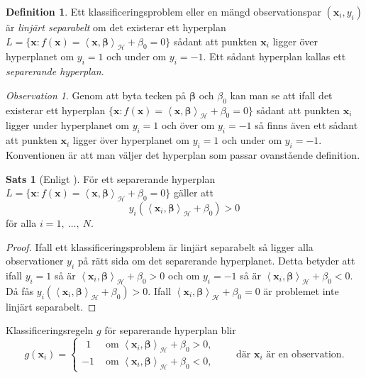 \documentclass[a4paper, 12pt]{report}
\theoremstyle{definition}
\newtheorem{thm}{Sats}[section]
\newtheorem{defi}{Definition}[section]
\theoremstyle{remark}
\newtheorem*{rem}{Observation}
\newcommand{\bfbeta}{{\boldsymbol{\beta}}}
\newcommand{\bfx}{\mathbf{x}}
\newcommand{\llangle}{\left\langle}
\newcommand{\rrangle}{\right\rangle}
\newcommand{\sephyp}{\{ \mathbf{x} : f\left(\mathbf{x}\right)=\inner{\bfx}{\bfbeta}_\mathcal{H} + \beta_0=0\}}
\newcommand{\inner}[2]{\llangle #1, #2 \rrangle}
\newcommand{\hil}{\mathcal{H}}
\begin{document}
\begin{defi}
	Ett klassificeringsproblem eller en mängd observationspar $\left(\mathbf{x}_i, y_i\right)$ är \textit{linjärt separabelt} om det existerar ett hyperplan $L=\sephyp$ sådant att punkten $\bfx_i$ ligger över hyperplanet om $y_i=1$ och under om $y_i=-1$. Ett sådant hyperplan kallas ett \emph{separerande hyperplan}.
\end{defi}
\begin{rem}
	Genom att byta tecken på $\bfbeta$ och $\beta_0$ kan man se att ifall det existerar ett hyperplan $\sephyp$ sådant att punkten $\bfx_i$ ligger under hyperplanet om $y_i=1$ och över om $y_i=-1$ så finns även ett sådant att punkten $\bfx_i$ ligger över hyperplanet om $y_i=1$ och under om $y_i=-1$.
	Konventionen är att man väljer det hyperplan som passar ovanstående definition.
\end{rem}
\begin{thm}[Enligt \cite{Boyd}]\label{thm:sephyppositive}
	För ett separerande hyperplan $L=\sephyp$ gäller att 
	\begin{equation*}
		y_i\left(\inner{\bfx_i}{\bfbeta}_\hil + \beta_0\right) > 0
	\end{equation*}
	för alla $i = 1,~\dots,~N$.
\end{thm}
\begin{proof}
	Ifall ett klassificeringsproblem är linjärt separabelt så ligger alla observationer $y_i$ på rätt sida om det separerande hyperplanet. Detta betyder att ifall $y_i=1$ så är $\inner{\bfx_i}{\bfbeta}_\hil + \beta_0 > 0$ och om $y_i=-1$ så är $\inner{\bfx_i}{\bfbeta}_\hil + \beta_0 < 0$.
	Då fås $y_i\left(\inner{\bfx_i}{\bfbeta}_\hil + \beta_0\right) > 0$. Ifall $\inner{\bfx_i}{\bfbeta}_\hil + \beta_0 = 0$ är problemet inte linjärt separabelt.
\end{proof}

Klassificeringsregeln $g$ för separerande hyperplan blir
\begin{equation*}
g\left(\mathbf{x}_i\right)=  
\begin{cases}
~~ 1 &\text{ om } \inner{\bfx_i}{\bfbeta}_\hil + \beta_0 > 0,\\
-1 &\text{ om } \inner{\bfx_i}{\bfbeta}_\hil + \beta_0 < 0,
\end{cases}\qquad\text{där }\bfx_i\text{ är en observation.}
\end{equation*}
\end{document}
